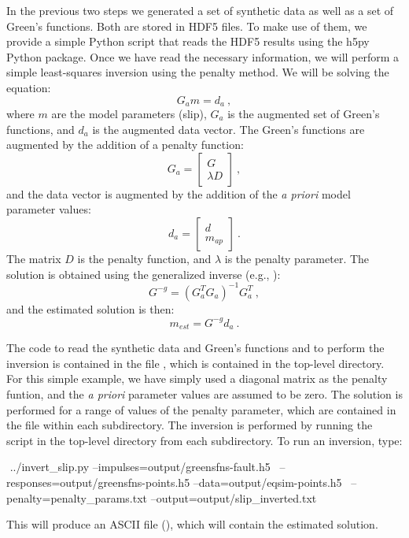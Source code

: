 In the previous two steps we generated a set of synthetic data as
well as a set of Green's functions. Both are stored in HDF5 files.
To make use of them, we provide a simple Python script that reads
the HDF5 results using the h5py Python package. Once we have read
the necessary information, we will perform a simple least-squares
inversion using the penalty method. We will be solving the equation:
\begin{equation}
G_{a}m=d_{a}\:,
\end{equation}
where $m$ are the model parameters (slip), $G_{a}$ is the augmented
set of Green's functions, and $d_{a}$ is the augmented data vector.
The Green's functions are augmented by the addition of a penalty function:
\begin{equation}
G_{a}=\left[\begin{array}{c}
G\\
\lambda D
\end{array}\right]\:,
\end{equation}
and the data vector is augmented by the addition of the \textit{a
priori} model parameter values:
\begin{equation}
d_{a}=\left[\begin{array}{c}
d\\
m_{ap}
\end{array}\right]\:.
\end{equation}
The matrix $D$ is the penalty function, and $\lambda$ is the penalty
parameter. The solution is obtained using the generalized inverse
(e.g., \cite{Menke:1984}):
\begin{equation}
G^{-g}=\left(G_{a}^{T}G_{a}\right)^{-1}G_{a}^{T}\:,
\end{equation}
and the estimated solution is then:
\begin{equation}
m_{est}=G^{-g}d_{a}\:.
\end{equation}


The code to read the synthetic data and Green's functions and to perform
the inversion is contained in the file , which
is contained in the top-level directory. For this simple example,
we have simply used a diagonal matrix as the penalty funtion, and
the \textit{a priori} parameter values are assumed to be zero. The
solution is performed for a range of values of the penalty parameter,
which are contained in the file  within
each subdirectory. The inversion is performed by running the script
in the top-level directory from each subdirectory. To run an inversion,
type:
\begin{shell}
$$ ../invert_slip.py --impulses=output/greensfns-fault.h5 \
   --responses=output/greensfns-points.h5 --data=output/eqsim-points.h5 \
   --penalty=penalty_params.txt --output=output/slip_inverted.txt \
\end{shell}
This will produce an ASCII file (\filename{slip\_inverted.txt}), which
will contain the estimated solution.


